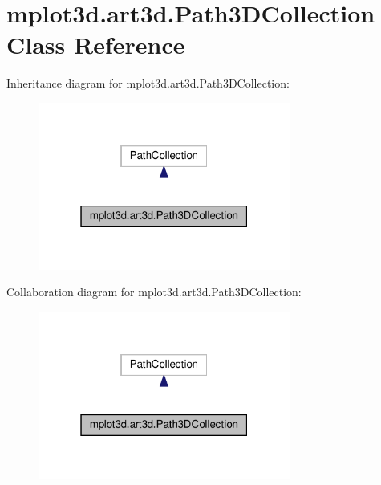 \hypertarget{classmplot3d_1_1art3d_1_1Path3DCollection}{}\section{mplot3d.\+art3d.\+Path3\+D\+Collection Class Reference}
\label{classmplot3d_1_1art3d_1_1Path3DCollection}


Inheritance diagram for mplot3d.\+art3d.\+Path3\+D\+Collection\+:
\nopagebreak
\begin{figure}[H]
\begin{center}
\leavevmode
\includegraphics[width=235pt]{classmplot3d_1_1art3d_1_1Path3DCollection__inherit__graph}
\end{center}
\end{figure}


Collaboration diagram for mplot3d.\+art3d.\+Path3\+D\+Collection\+:
\nopagebreak
\begin{figure}[H]
\begin{center}
\leavevmode
\includegraphics[width=235pt]{classmplot3d_1_1art3d_1_1Path3DCollection__coll__graph}
\end{center}
\end{figure}
